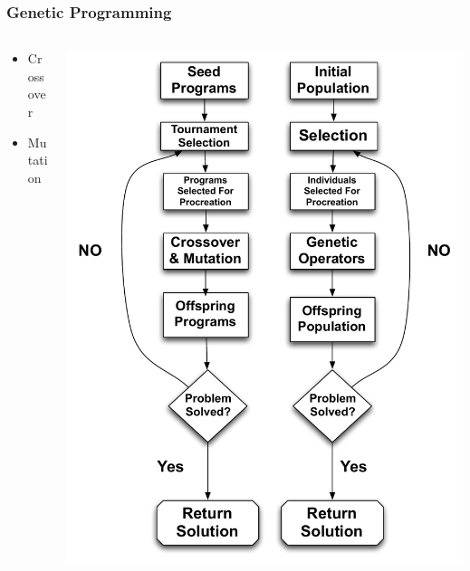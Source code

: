 \documentclass{beamer}
\begin{document}
\begin{frame}
	\frametitle{Genetic Programming}
\begin{columns}
\begin{column}{0.5\textwidth}
\begin{itemize}	
	\item Crossover
	\item Mutation
\end{itemize}
\end{column}
\begin{column}{0.5\textwidth}
   \includegraphics[height=0.90\textheight]{Illustrations/GP3.pdf}
       \\
\end{column}
\end{columns}

\end{frame}
\end{document}
